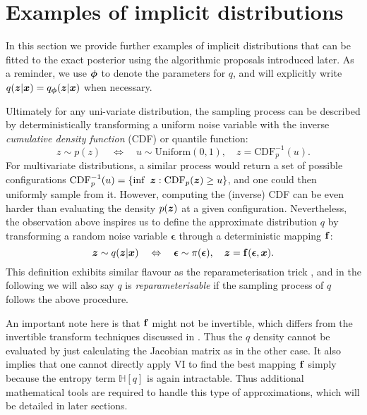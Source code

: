 \section{Examples of implicit distributions}
\label{sec:chap5_wild_dist}
In this section we provide further examples of implicit distributions that can be fitted to the exact posterior using the algorithmic proposals introduced later.
%
As a reminder, we use $\bm{\phi}$ to denote the parameters for $q$, and will explicitly write $q(\bm{z}|\bm{x}) = q_{\bm{\phi}}(\bm{z} | \bm{x})$ when necessary. 

Ultimately for any uni-variate distribution, the sampling process can be described by deterministically transforming a uniform noise variable with the inverse \emph{cumulative density function} (CDF) or quantile function:
\begin{equation}
z \sim p(z) \quad \Leftrightarrow \quad u \sim \text{Uniform}(0, 1), \quad z = \text{CDF}_{p}^{-1}(u).
\end{equation}
For multivariate distributions, a similar process would return a set of possible configurations $\text{CDF}_{p}^{-1}(u) = \{ \inf ~ \bm{z} : \text{CDF}_{p}(\bm{z}) \geq u \}$, and one could then uniformly sample from it. However, computing the (inverse) CDF can be even harder than evaluating the density $p(\bm{z})$ at a given configuration. Nevertheless, the observation above inspires us to define the approximate distribution $q$ by transforming a random noise variable $\bm{\epsilon}$ through a deterministic mapping $\mathbf{f}$:
\begin{equation}
\bm{z} \sim q(\bm{z} | \bm{x}) \quad \Leftrightarrow \quad \bm{\epsilon} \sim \pi(\bm{\epsilon}), \quad \bm{z} = \mathbf{f}(\bm{\epsilon}, \bm{x}).
\end{equation}
This definition exhibits similar flavour as the reparameterisation trick \citep{kingma:vae2014}, and in the following we will also say $q$ is \emph{reparameterisable} if the sampling process of $q$ follows the above procedure.

An important note here is that $\mathbf{f}$ might not be invertible, which differs from the invertible transform techniques discussed in \citep{rezende:flow2015,kingma:iaf2016}. Thus the $q$ density cannot be evaluated by just calculating the Jacobian matrix as in the other case. It also implies that one cannot directly apply VI to find the best mapping $\mathbf{f}$ simply because the entropy term $\mathbb{H}[q]$ is again intractable.%
%
Thus additional mathematical tools are required to handle this type of approximations, which will be detailed in later sections. 

